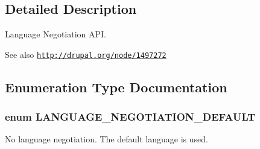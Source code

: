 \subsection{Detailed Description}
Language Negotiation API.

\begin{DoxySeeAlso}{See also}
\href{http://drupal.org/node/1497272}{\tt http://drupal.org/node/1497272} 
\end{DoxySeeAlso}


\subsection{Enumeration Type Documentation}
\hypertarget{includes_2language_8inc_a62b928f1b1b803ed9be8ecaa376867b2}{
\subsubsection[{LANGUAGE\_\-NEGOTIATION\_\-DEFAULT}]{\setlength{\rightskip}{0pt plus 5cm}enum {\bf LANGUAGE\_\-NEGOTIATION\_\-DEFAULT}}}
\label{includes_2language_8inc_a62b928f1b1b803ed9be8ecaa376867b2}
No language negotiation. The default language is used. 
